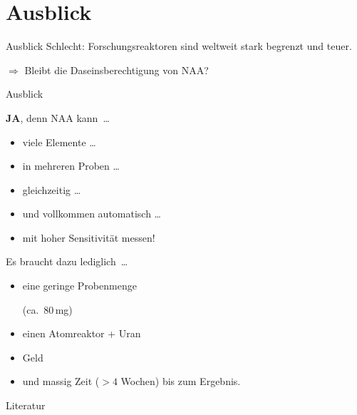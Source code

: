 \documentclass[xcolor=x11names, aspectratio=169]{beamer}
\begin{document}
\section{Ausblick}

\begin{frame}{Ausblick}
Schlecht: Forschungsreaktoren sind weltweit \alert{stark begrenzt} und \alert{teuer}.\pause

\begin{center}
\Large$\Rightarrow$ Bleibt die Daseinsberechtigung von NAA?
\end{center}
\end{frame}

\begin{frame}{Ausblick}
\begin{minipage}[t]{0.48\textwidth}\flushleft
\textbf{JA}, denn NAA kann\ \dots\pause
\begin{itemize}
\item \alert{viele} Elemente \dots\pause
\item in \alert{mehreren Proben} \dots\pause
\item \alert{gleichzeitig} \dots\pause
\item und vollkommen \alert{automatisch} \dots\pause
\item mit \alert{hoher Sensitivität} messen!
\end{itemize}
\end{minipage}\pause
\begin{minipage}[t]{0.48\textwidth}
Es braucht dazu \glqq lediglich\grqq\ \dots
\begin{itemize}
\item eine \alert{geringe} Probenmenge

(ca.\ 80\,mg)\pause
\item einen Atomreaktor + Uran\pause
\item Geld\pause
\item und massig \alert{Zeit} ($>4$ Wochen) bis zum Ergebnis.
\end{itemize}
\end{minipage}
\end{frame}

\begin{frame}{Literatur}
\nocite{*}

\printbibliography[heading=none]
\end{frame}

\maketitle
\end{document}
